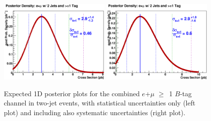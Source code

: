 \vspace{0.1in}
\begin{figure}[!h!tbp]
\includegraphics[width=0.49\textwidth]
{eps/MatrixElement/posterior/nosys/expected_limit_TBTQ_LeptonsCombined_2Jet_TagsCombined}
\includegraphics[width=0.49\textwidth]
{eps/MatrixElement/posterior/sys/expected_limit_TBTQ_LeptonsCombined_2Jet_TagsCombined}
\vspace{-0.1in}
\caption{Expected 1D posterior plots for the combined
$e$+$\mu$ $\geq$~1 $B$-tag channel in two-jet events, with statistical
uncertainties only (left plot) and including also systematic
uncertainties (right plot).}
\label{exp-post-1d-2j}
\end{figure}

